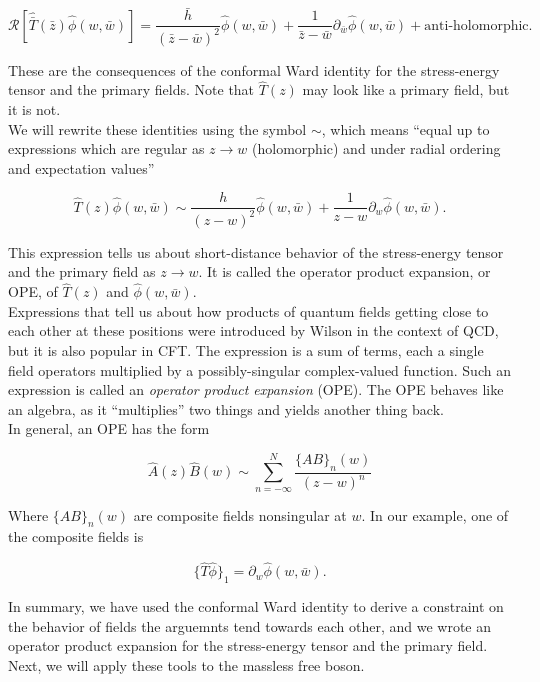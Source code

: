 \begin{equation}
\mathcal{R} [ \hat{\bar{T}} (\bar{z}) \hat{\phi} (w, \bar{w}) ] = \frac{\bar{h}}{(\bar{z}-\bar{w})^2} \hat{\phi} (w, \bar{w}) + \frac{1}{\bar{z}-\bar{w}} \partial_{\bar{w}} \hat{\phi} (w, \bar{w}) + \text{anti-holomorphic}.
\end{equation}

\noindent These are the consequences of the conformal Ward identity for the stress-energy tensor and the primary fields. Note that $\hat{T} (z)$ may look like a primary field, but it is not. \\

\noindent We will rewrite these identities using the symbol $\sim$, which means ``equal up to expressions which are regular as $z\rightarrow w$ (holomorphic) and under radial ordering and expectation values''

\begin{equation}
\hat{T} (z) \hat{\phi} (w, \bar{w}) \sim \frac{h}{(z-w)^2} \hat{\phi} (w, \bar{w}) + \frac{1}{z-w} \partial_w \hat{\phi} (w,\bar{w}) .
\end{equation}

\noindent This expression tells us about short-distance behavior of the stress-energy tensor and the primary field as $z \rightarrow w$. It is called the operator product expansion, or OPE, of  $\hat{T} (z)$ and $\hat{\phi} (w, \bar{w})$. \\

\noindent Expressions that tell us about how products of quantum fields getting close to each other at these positions were introduced by Wilson in the context of QCD, but it is also popular in CFT. The expression is a sum of terms, each a single field operators multiplied by a possibly-singular complex-valued function. Such an expression is called an \textit{operator product expansion} (OPE). The OPE behaves like an algebra, as it ``multiplies'' two things and yields another thing back. \\

\noindent In general, an OPE has the form

\begin{equation}
\hat{A} (z) \hat{B} (w) \sim \sum_{n=-\infty}^N \frac{\{AB\}_n (w)}{(z-w)^n}
\end{equation}

\noindent Where $\{AB\}_n (w)$ are composite fields nonsingular at $w$. In our example, one of the composite fields is 

\begin{equation}
\{\hat{T} \hat{\phi}\}_1 = \partial_w \hat{\phi} (w,\bar{w}).
\end{equation}

\noindent In summary, we have used the conformal Ward identity to derive a constraint on the behavior of fields the arguemnts tend towards each other, and we wrote an operator product expansion for the stress-energy tensor and the primary field. Next, we will apply these tools to the massless free boson.